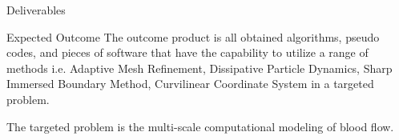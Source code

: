 \documentclass[\string~/GitHub/sthlmNordBeamerTheme/sthlmNordLightDemo.tex]{subfiles}
\begin{document}
\begin{frame}[c]{Deliverables}

    \begin{exampleblock}{Expected Outcome}
        The outcome product is all obtained algorithms, pseudo codes, and pieces of software that have the capability to utilize a range of methods i.e. Adaptive Mesh Refinement, Dissipative Particle Dynamics, Sharp Immersed Boundary Method, Curvilinear Coordinate System in a targeted problem.
    \end{exampleblock}
    
    \begin{alertblock}{}
        The targeted problem is the multi-scale computational modeling of blood flow.    
    \end{alertblock}
 
\end{frame}
\end{document}
